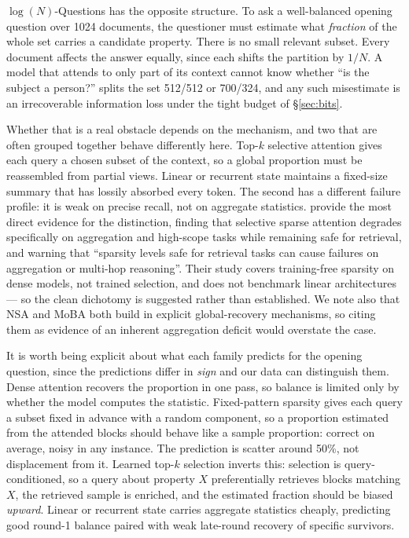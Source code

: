 \documentclass[11pt]{article}
\begin{document}
$\log(N)$-Questions has the opposite structure. To ask a well-balanced opening
question over 1024 documents, the questioner must estimate what \emph{fraction}
of the whole set carries a candidate property. There is no small relevant
subset. Every document affects the answer equally, since each shifts the
partition by $1/N$. A model that attends to only part of its context cannot
know whether ``is the subject a person?'' splits the set 512/512 or 700/324,
and any such misestimate is an irrecoverable information loss under the tight
budget of \S\ref{sec:bits}.

Whether that is a real obstacle depends on the mechanism, and two that are
often grouped together behave differently here.
Top-$k$ selective attention gives each query a chosen subset of the context, so
a global proportion must be reassembled from partial views. Linear or recurrent
state maintains a fixed-size summary that has lossily absorbed every token.
The second has a different failure profile: it is weak on precise recall, not
on aggregate statistics. \citet{nawrot2025sparse}
provide the most direct evidence for the distinction, finding that selective
sparse attention degrades specifically on aggregation and high-scope tasks
while remaining safe for retrieval, and warning that ``sparsity levels safe for
retrieval tasks can cause failures on aggregation or multi-hop reasoning''.
Their study covers training-free sparsity on dense models, not trained
selection, and does not benchmark linear architectures --- so the clean
dichotomy is suggested rather than established. We note also that NSA and MoBA
both build in explicit global-recovery mechanisms, so citing them as evidence
of an inherent aggregation deficit would overstate the case.

It is worth being explicit about what each family predicts for the opening
question, since the predictions differ in \emph{sign} and our data can
distinguish them. Dense attention recovers the proportion in one pass, so
balance is limited only by whether the model computes the statistic.
Fixed-pattern sparsity gives each query a subset fixed in advance with a random
component, so a proportion estimated from the attended blocks should behave like
a sample proportion: correct on average, noisy in any instance. The prediction
is scatter around 50\%, not displacement from it. Learned top-$k$ selection
inverts this: selection is query-conditioned, so a query about property $X$
preferentially retrieves blocks matching $X$, the retrieved sample is enriched,
and the estimated fraction should be biased \emph{upward}. Linear or recurrent
state carries aggregate statistics cheaply, predicting good round-1 balance
paired with weak late-round recovery of specific survivors.
\end{document}
